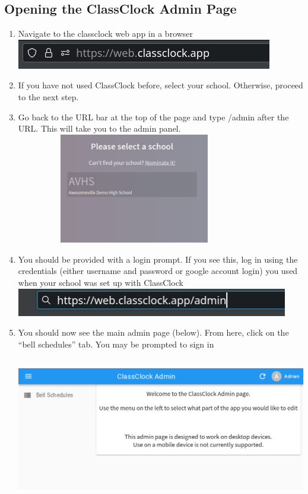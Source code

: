 \documentclass{article}
\begin{document}
\subsection{Opening the ClassClock Admin Page}
\begin{enumerate}
\item {Navigate to the classclock web app in a browser}
\includegraphics[width=4.4055in,height=0.5102in]{Mini20Manual-img007.png}
\item {If you have not used ClassClock before, select your school. Otherwise, proceed to the next step.}
\item {Go back to the URL bar at the top of the page and type /admin after the URL. This will take you to the admin panel.}
\includegraphics[width=4.0744in,height=1.9016in]{Mini20Manual-img008.png}
\item {You should be provided with a login prompt. If you see this, log in using the credentials (either username and password
or google account login) you used when your school was set up with ClassClock}
\includegraphics[width=4.6866in,height=0.4783in]{Mini20Manual-img009.png}
\item {You should now see the main admin page (below). From here, click on the “bell schedules” tab. You may be prompted to
sign in}
\includegraphics[width=6.5in,height=2.7626in]{Mini20Manual-img004.png}
\end{enumerate}
\end{document}
